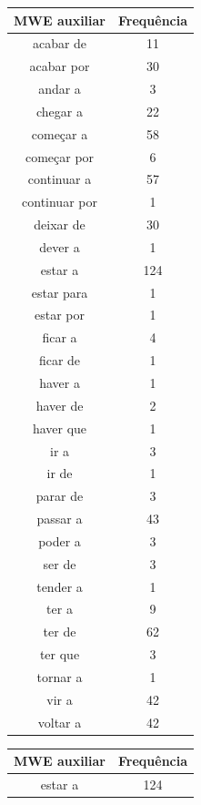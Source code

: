 \documentclass[output=paper,colorlinks,citecolor=brown]{langscibook}
\begin{document}
	\begin{table}[]
		\parbox{.45\linewidth}{
			\centering
			\begin{tabular}{|c|c|}
				\hline
				\textbf{MWE auxiliar} & \textbf{Frequência} \\\hline
				acabar de & 11\\\hline
				acabar por & 30\\\hline
				andar a & 3\\\hline
				chegar a & 22\\\hline
				começar a & 58\\\hline
				começar por & 6\\\hline
				continuar a & 57\\\hline
				continuar por & 1\\\hline
				deixar de & 30\\\hline
				dever a & 1\\\hline
				estar a & 124\\\hline
				estar para & 1\\\hline
				estar por & 1\\\hline
				ficar a & 4\\\hline
				ficar de & 1\\\hline
				haver a & 1\\\hline
				haver de & 2\\\hline
				haver que & 1\\\hline
				ir a & 3\\\hline
				ir de & 1\\\hline
				parar de & 3\\\hline
				passar a & 43\\\hline
				poder a & 3\\\hline
				ser de & 3\\\hline
				tender a & 1\\\hline
				ter a & 9\\\hline
				ter de & 62\\\hline
				ter que & 3\\\hline
				tornar a & 1\\\hline
				vir a & 42\\\hline
				voltar a & 42\\\hline
			\end{tabular}
		}
		\hfill
		\parbox{.45\linewidth}{
			\centering
			\begin{tabular}{|c|c|}
				\hline
				\textbf{MWE auxiliar} & \textbf{Frequência} \\\hline
				estar a & 124\\\hline

\end{tabular}}
\end{table}
\end{document}
